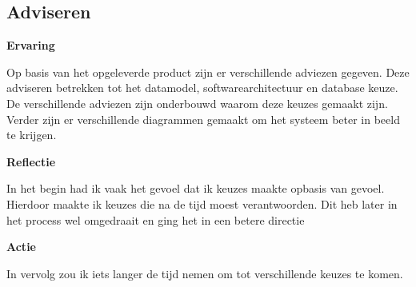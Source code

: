 \subsection{Adviseren}

\textbf{Ervaring}

\whitespace
Op basis van het opgeleverde product zijn er verschillende adviezen gegeven.
Deze adviseren betrekken tot het datamodel, softwarearchitectuur en database keuze.
De verschillende adviezen zijn onderbouwd waarom deze keuzes gemaakt zijn.
Verder zijn er verschillende diagrammen gemaakt om het systeem beter in beeld te krijgen.

\whitespace
\textbf{Reflectie}

\whitespace
In het begin had ik vaak het gevoel dat ik keuzes maakte opbasis van gevoel.
Hierdoor maakte ik keuzes die na de tijd moest verantwoorden.
Dit heb later in het process wel omgedraait en ging het in een betere directie

\whitespace
\textbf{Actie}

\whitespace
In vervolg zou ik iets langer de tijd nemen om tot verschillende keuzes te komen.

